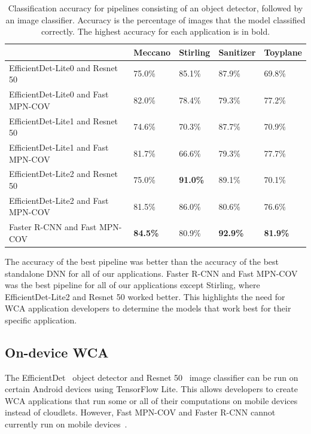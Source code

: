 \begin{table}
\begin{tabular}{|l||l|l|l|l|}
  \hline
  & Meccano & Stirling & Sanitizer & Toyplane\\
  \hline
  \hline
  EfficientDet-Lite0 and Resnet 50 & 75.0\% & 85.1\% & 87.9\% & 69.8\%\\
  EfficientDet-Lite0 and Fast MPN-COV & 82.0\% & 78.4\% & 79.3\% & 77.2\%\\
  EfficientDet-Lite1 and Resnet 50 & 74.6\% & 70.3\% & 87.7\% & 70.9\%\\
  EfficientDet-Lite1 and Fast MPN-COV & 81.7\% & 66.6\% & 79.3\% & 77.7\%\\
  EfficientDet-Lite2 and Resnet 50 & 75.0\% & \textbf{91.0\%} & 89.1\% & 70.1\%\\
  EfficientDet-Lite2 and Fast MPN-COV & 81.5\% & 86.0\% & 80.6\% & 76.6\%\\
  Faster R-CNN and Fast MPN-COV & \textbf{84.5\%} & 80.9\% & \textbf{92.9\%} & \textbf{81.9\%}\\
  \hline
\end{tabular}
  \caption{
    Classification accuracy for pipelines consisting of an object detector,
    followed by an image classifier.
    Accuracy is the percentage of images that the model classified correctly.
    The highest accuracy for each application is in bold.
  }\label{tab:pipeline_accuracy}
\end{table}

The accuracy of the best pipeline was better than the accuracy of the best
standalone DNN for all of our applications.
Faster R-CNN and Fast MPN-COV was the best pipeline for all of our applications
except Stirling, where EfficientDet-Lite2 and Resnet 50 worked better.
This highlights the need for WCA application developers to determine the models
that work best for their specific application.

\subsection{On-device WCA}

The EfficientDet~\cite{Tan2020} object detector and Resnet 50~\cite{He2016}
image classifier can be run on certain Android devices using TensorFlow Lite.
This allows developers to create WCA applications that run some or all of their
computations on mobile devices instead of cloudlets.
However, Fast MPN-COV and Faster R-CNN cannot currently run on mobile
devices~\cite{tflite, torchscript}.

